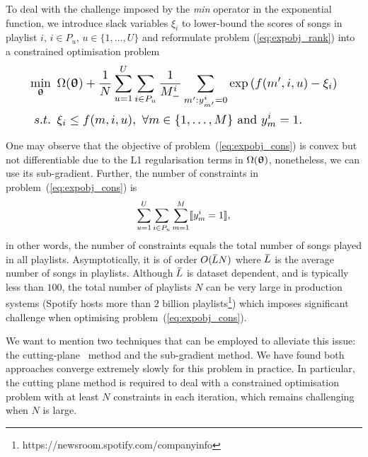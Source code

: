 To deal with the challenge imposed by the \emph{min} operator in the exponential function, 
we introduce slack variables $\xi_i$ to lower-bound the scores of songs in playlist $i, \, i \in P_u, \, u \in \{1,\dots,U\}$ 
and 
reformulate problem (\ref{eq:expobj_rank}) into a constrained optimisation problem %
\begin{equation}
\label{eq:expobj_cons}
\resizebox{.9\linewidth}{!}{$\displaystyle
\begin{aligned}
\min_{\upthetabm} \ \, & 
\Omega(\upthetabm) + \frac{1}{N} \sum_{u=1}^U \sum_{i \in P_u} \frac{1}{M_-^i} \sum_{m': y_{m'}^i = 0} \exp \left( f(m', i, u) - \xi_i \right) \\
s.t. \ \, & 
\xi_i \le f(m, i, u), \ \forall m \in \{1,\dots,M\} \ \text{and} \ y_m^i = 1.
\end{aligned}
$}
\end{equation}

One may observe that the objective of problem~(\ref{eq:expobj_cons}) is convex but not differentiable due to 
the L1 regularisation terms in $\Omega({\bm{\uptheta}})$, nonetheless, we can use its sub-gradient.
Further, the number of constraints in problem~(\ref{eq:expobj_cons}) is
$$
\sum_{u=1}^U \sum_{i \in P_u} \sum_{m=1}^M \llbracket y_m^i = 1 \rrbracket,
$$
in other words, the number of constraints equals the total number of songs played in all playlists.
Asymptotically, it is of order $O(\widebar{L} N)$ where $\widebar{L}$ is the average number of songs in playlists.
Although $\widebar{L}$ is dataset dependent, and is typically less than $100$,
the total number of playlists $N$ can be very large in production systems 
(\eg Spotify hosts more than $2$ billion playlists\footnote{https://newsroom.spotify.com/companyinfo})
which imposes significant challenge when optimising problem~(\ref{eq:expobj_cons}).

We want to mention two techniques that can be employed to alleviate this issue:
the cutting-plane~\cite{avriel2003nonlinear} method and the sub-gradient method.
We have found both approaches converge extremely slowly for this problem in practice.
In particular, the cutting plane method is required to deal with a constrained optimisation problem 
with at least $N$ constraints in each iteration, which remains challenging when $N$ is large.

